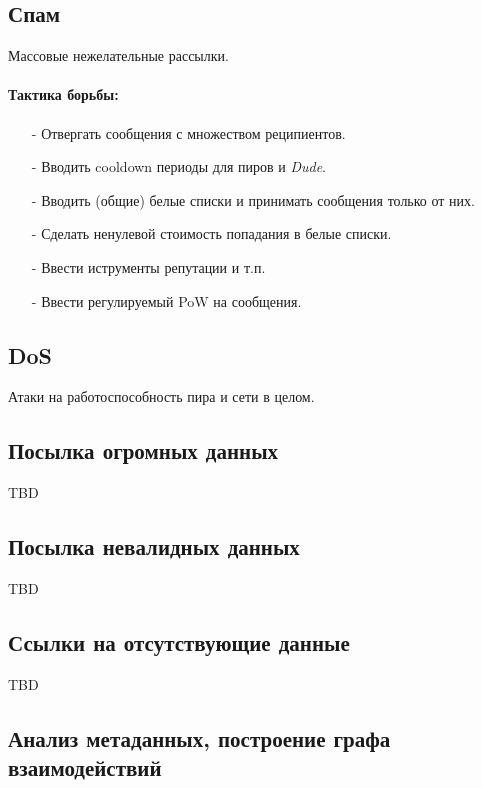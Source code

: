 \documentclass[11pt,a4paper]{article}
\newcommand{\term}[2]{\textit{#2}}
\newcommand{\Dude}{\term{dude}{Dude}}
\begin{document}
\subsection{Спам}

Массовые нежелательные рассылки.

\paragraph{Тактика борьбы:}

\begin{itemize}
 \item[-] Отвергать сообщения с множеством реципиентов.
 \item[-] Вводить cooldown периоды для пиров и \Dude{}.
 \item[-] Вводить (общие) белые списки и принимать сообщения только от них.
 \item[-] Сделать ненулевой стоимость попадания в белые списки.
 \item[-] Ввести иструменты репутации и т.п.
 \item[-] Ввести регулируемый PoW на сообщения.
\end{itemize}

\subsection{DoS}

Атаки на работоспособность пира и сети в целом.

\subsection{Посылка огромных данных}

TBD

\subsection{Посылка невалидных данных}

TBD

\subsection{Ссылки на отсутствующие данные}

TBD

\subsection{Анализ метаданных, построение графа взаимодействий}
\end{document}
